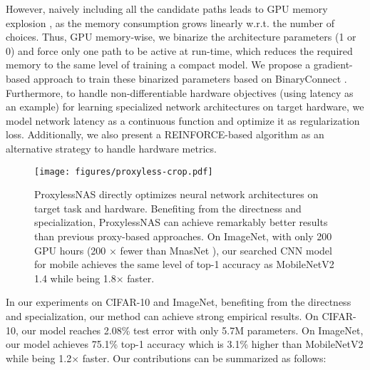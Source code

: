 \documentclass{article} \usepackage{iclr2019_conference,times}
\begin{document}
However, naively including all the candidate paths leads to GPU memory explosion \citep{liu2018darts,bender2018understanding}, as the memory consumption grows linearly w.r.t. the number of choices. Thus, GPU memory-wise, we binarize the architecture parameters (1 or 0) and force only one path to be active at run-time, which reduces the required memory to the same level of training a compact model. We propose a gradient-based approach to train these binarized parameters based on BinaryConnect \citep{courbariaux2015binaryconnect}. Furthermore, to handle non-differentiable hardware objectives (using latency as an example) for learning specialized network architectures on target hardware, we model network latency as a continuous function and optimize it as regularization loss. Additionally, we also present a REINFORCE-based \citep{williams1992simple} algorithm as an alternative strategy to handle hardware metrics.

\begin{figure}[t]
    \vspace{-10pt}
    \centering
    \texttt{[image: figures/proxyless-crop.pdf]}
    \caption{ProxylessNAS directly optimizes neural network architectures on target task and hardware. Benefiting from the directness and specialization, ProxylessNAS can achieve remarkably better results than previous proxy-based approaches. On ImageNet, with only 200 GPU hours (200 $\times$ fewer than MnasNet \citep{tan2018mnasnet}), our searched CNN model for mobile achieves the same level of top-1 accuracy as MobileNetV2 1.4 while being 1.8$\times$ faster.}
    \vspace{-10pt}
    \label{fig:proxyless}
\end{figure}

In our experiments on CIFAR-10 and ImageNet, benefiting from the directness and specialization, our method can achieve strong empirical results. On CIFAR-10, our model reaches 2.08\% test error with only 5.7M parameters. On ImageNet, our model achieves 75.1\% top-1 accuracy which is 3.1\% higher than MobileNetV2 \citep{sandler2018mobilenetv2} while being 1.2$\times$ faster. Our contributions can be summarized as follows:
\end{document}
